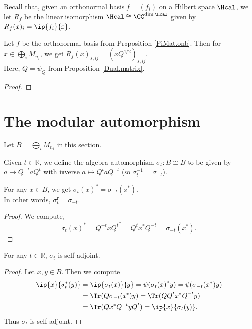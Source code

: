  Recall that, given an orthonormal basis $f=(f_i)$ on a Hilbert space $\Hcal$, we let $R_f$ be the linear isomorphism $\Hcal \cong \CC^{\dim\Hcal}$ given by $R_f(x)_i=\ip{f_i}{x}$.
 \begin{proposition}\label{PiMat.onb_repr}\leanok
  Let $f$ be the orthonormal basis from Proposition \ref{PiMat.onb}.
  Then for $x\in\bigoplus_iM_{n_i}$, we get $R_f(x)_{s,ij}=(xQ^{1/2})_{s,ij}$.\\
  Here, $Q=\psi_Q$ from Proposition \ref{Dual.matrix}.
 \end{proposition}
 \begin{proof}
 \end{proof}

\section{The modular automorphism}
 Let $B=\bigoplus_iM_{n_i}$ in this section.

 \begin{definition}\label{modAut}
  \leanok
  Given $t\in\mathbb{R}$, we define the algebra automorphism $\sigma_t\colon B\cong B$ to be given by $a\mapsto Q^{-t}aQ^{t}$ with inverse $a\mapsto Q^taQ^{-t}$ (so $\sigma_t^{-1}=\sigma_{-t}$).
 \end{definition}

 \begin{proposition}\label{modAut_real_apply}
  \leanok
  For any $x\in B$, we get ${\sigma_{t}(x)}^*=\sigma_{-t}(x^*)$.\\
  In other words, $\sigma_t^{\operatorname{r}}=\sigma_{-t}$.
 \end{proposition}
 \begin{proof}\leanok
  We compute,
  \[{\sigma_{t}(x)}^*={Q^{-t}xQ^t}^*=Q^tx^*Q^{-t}=\sigma_{-t}(x^*).\]
 \end{proof}
 
 \begin{proposition}\label{modAut_isSelfAdjoint}
  \leanok
  For any $t\in\mathbb{R}$, $\sigma_t$ is self-adjoint.
 \end{proposition}
 \begin{proof}\leanok
  Let $x,y\in{B}$. Then we compute
  \begin{align*}
   \ip{x}{\sigma_{t}^*(y)} &= \ip{\sigma_{t}(x)}{y}=\psi({\sigma_{t}(x)}^*y)=\psi(\sigma_{-t}(x^*)y)\\
   &=\Tr(Q\sigma_{-t}(x^*)y)=\Tr(QQ^tx^*Q^{-t}y)\\
   &= \Tr(Q x^*Q^{-t}yQ^t)=\ip{x}{\sigma_{t}(y)}.
  \end{align*}
  Thus $\sigma_{t}$ is self-adjoint.
 \end{proof}

